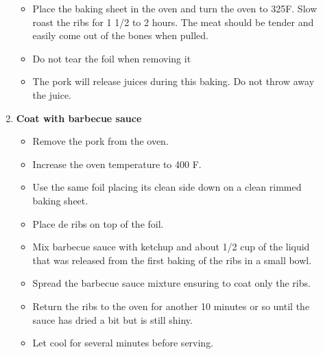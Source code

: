 \documentclass [11pt, letterpaper] {article}
\newcommand \fileName {BBQedPorkBackRibs}
\begin{document}
\begin{description}
\begin{enumerate}
\begin{itemize}
		\item Place the baking sheet in the oven and turn the oven to 325F. Slow roast the ribs for 1 1/2 to 2 hours. The meat should be tender and easily come out of the bones when pulled. 
                 \item Do not tear the foil when removing it
		\item The pork will release juices during this baking. Do not throw away the juice.
		\end{itemize}
	\item {\bf Coat with barbecue sauce}
		\begin{itemize}
		 \item Remove the pork from the oven.
		 \item Increase the oven temperature to 400 F.
		 \item Use the same foil placing its clean side down on a clean rimmed baking sheet.  
                 \item Place de ribs on top of the foil.
		\item Mix barbecue sauce with ketchup and about 1/2 cup of the liquid that was released from the first baking of the ribs in a small bowl.
		\item Spread the barbecue sauce mixture ensuring to coat only the ribs.
		\item Return the ribs to the oven for another 10 minutes or so until the sauce has dried a bit but is still shiny.
		\item Let cool for several minutes before serving. 
		\end{itemize}
     	\end{enumerate}         
\end{description}

\end{document}
